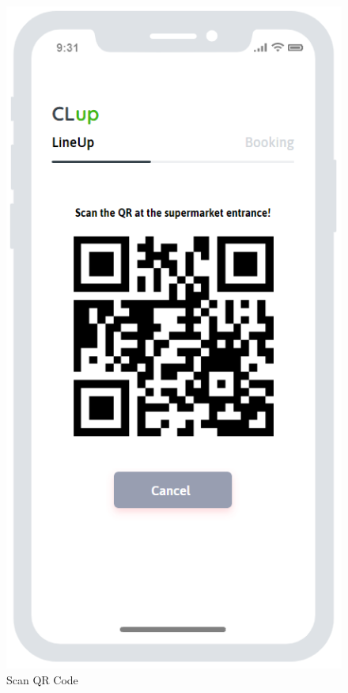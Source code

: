 \begin{figure}[H]
\begin{minipage}{0.3\linewidth} 
\includegraphics[width=\textwidth]{./Images/MockupLogo/mockQRCode}
\caption{Scan QR Code}
\end{minipage} 
\hfill 

\end{figure}
